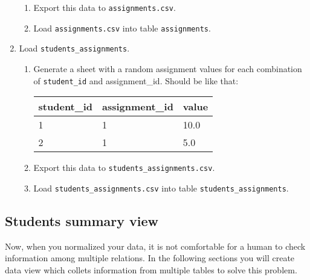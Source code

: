 \documentclass[12pt]{article}
\newcommand{\code}[1]{\texttt{#1}}
\begin{document}
\begin{enumerate}
\begin{enumerate}
\item Export this data to \code{assignments.csv}.

\item Load \code{assignments.csv} into table \code{assignments}.

\end{enumerate}

\item Load \code{students\_assignments}.

\begin{enumerate}

\item Generate a sheet with a random assignment values for each combination of \code{student\_id} and {assignment\_id}. Should be like that:

\begin{tabular}{| l | l | l | }
  \hline
  \textbf{student\_id} & \textbf{assignment\_id} & \textbf{value} \\
  \hline
  1 & 1 & 10.0 \\
  2 & 1 & 5.0 \\
  \hline
\end{tabular}

\item Export this data to \code{students\_assignments.csv}.

\item Load \code{students\_assignments.csv} into table \code{students\_assignments}.

\end{enumerate}

\end{enumerate}

\subsection*{Students summary view}

Now, when you normalized your data, it is not comfortable for a human to check information among multiple relations. In the following sections you will create data view which collets information from multiple tables to solve this problem.
\end{document}
